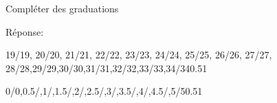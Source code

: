 \documentclass[a4paper,11pt]{report}
\begin{document}
\begin{resolu}{Compléter des graduations}
{\begin{tasks}
Réponse:
\begin{center}
	\begin{numberlined}{19}{34}{1}{1}{19/19, 20/20, 21/21, 22/22, 23/23, 24/24, 25/25, 26/26, 27/27, 28/28,29/29,30/30,31/31,32/32,33/33,34/34}{0.5}{1}{}
\end{numberlined}
\end{center}
\task \begin{center}
	\begin{numberlined}{0}{5}{1}{1}{0/0,0.5/,1/,1.5/,2/,2.5/,3/,3.5/,4/,4.5/,5/5}{0.5}{1}{}
\end{numberlined}
\end{center}


\end{tasks}}
\end{resolu}
\end{document}
